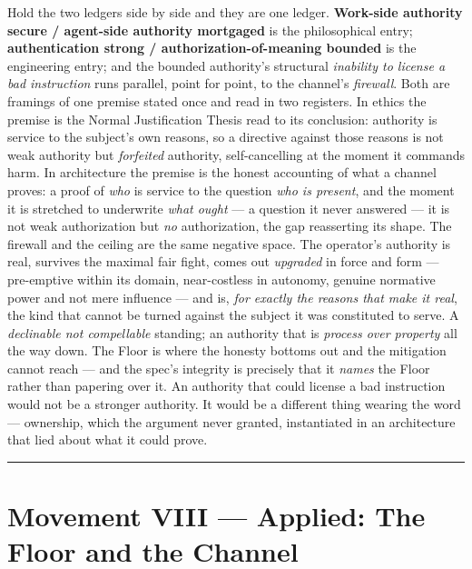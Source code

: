 \documentclass[11pt]{article}
\begin{document}
Hold the two ledgers side by side and they are one ledger. \textbf{Work-side authority secure /\allowbreak{} agent-side authority mortgaged} is the philosophical entry; \textbf{authentication strong /\allowbreak{} authorization-of-meaning bounded} is the engineering entry; and the bounded authority's structural \emph{inability to license a bad instruction} runs parallel, point for point, to the channel's \emph{firewall}. Both are framings of one premise stated once and read in two registers. In ethics the premise is the Normal Justification Thesis read to its conclusion: authority is service to the subject's own reasons, so a directive against those reasons is not weak authority but \emph{forfeited} authority, self-cancelling at the moment it commands harm. In architecture the premise is the honest accounting of what a channel proves: a proof of \emph{who} is service to the question \emph{who is present}, and the moment it is stretched to underwrite \emph{what ought} — a question it never answered — it is not weak authorization but \emph{no} authorization, the gap reasserting its shape. The firewall and the ceiling are the same negative space. The operator's authority is real, survives the maximal fair fight, comes out \emph{upgraded} in force and form — pre-emptive within its domain, near-costless in autonomy, genuine normative power and not mere influence — and is, \emph{for exactly the reasons that make it real}, the kind that cannot be turned against the subject it was constituted to serve. A \emph{declinable not compellable} standing; an authority that is \emph{process over property} all the way down. The Floor is where the honesty bottoms out and the mitigation cannot reach — and the spec's integrity is precisely that it \emph{names} the Floor rather than papering over it. An authority that could license a bad instruction would not be a stronger authority. It would be a different thing wearing the word — ownership, which the argument never granted, instantiated in an architecture that lied about what it could prove.

\medskip\noindent\rule{\linewidth}{0.3pt}\medskip

\section*{Movement VIII — Applied: The Floor and the Channel}
\end{document}
